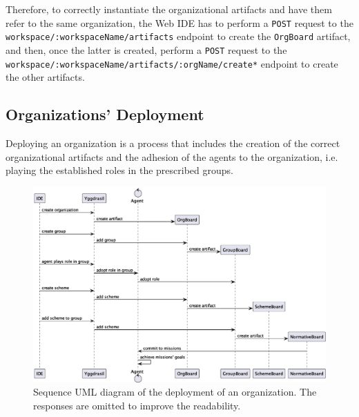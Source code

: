 Therefore, to correctly instantiate the organizational artifacts and have them refer to the same organization, the Web IDE has to perform a \texttt{POST} request to the \texttt{workspace/:workspaceName/artifacts} endpoint to create the \texttt{OrgBoard} artifact, and then, once the latter is created, perform a \texttt{POST} request to the \texttt{workspace/:workspaceName/artifacts/:orgName/create*} endpoint to create the other artifacts.

\subsection{Organizations' Deployment}
Deploying an organization is a process that includes the creation of the correct organizational artifacts and the adhesion of the agents to the organization, i.e. playing the established roles in the prescribed groups.

\begin{figure}
    \centering
    \includegraphics[width=\textwidth]{images/uml/org-creation.eps}
    \caption{Sequence UML diagram of the deployment of an organization. The responses are omitted to improve the readability.}
    \label{fig:org-creation}
\end{figure}


